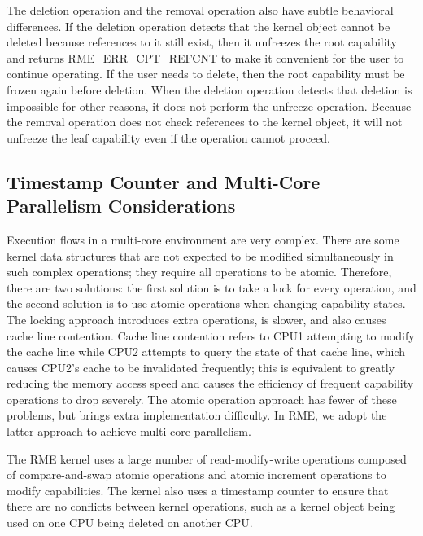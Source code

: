 The deletion operation and the removal operation also have subtle behavioral differences. If the deletion operation detects that the kernel object cannot be deleted because references to it still exist, then it unfreezes the root capability and returns RME\_ERR\_CPT\_REFCNT to make it convenient for the user to continue operating. If the user needs to delete, then the root capability must be frozen again before deletion. When the deletion operation detects that deletion is impossible for other reasons, it does not perform the unfreeze operation. Because the removal operation does not check references to the kernel object, it will not unfreeze the leaf capability even if the operation cannot proceed.

\subsection{Timestamp Counter and Multi-Core Parallelism Considerations}\label{subsec:2-timestamp-counter-and-multicore-parallelism}

Execution flows in a multi-core environment are very complex. There are some kernel data structures that are not expected to be modified simultaneously in such complex operations; they require all operations to be atomic. Therefore, there are two solutions: the first solution is to take a lock for every operation, and the second solution is to use atomic operations when changing capability states. The locking approach introduces extra operations, is slower, and also causes cache line contention. Cache line contention refers to CPU1 attempting to modify the cache line while CPU2 attempts to query the state of that cache line, which causes CPU2's cache to be invalidated frequently; this is equivalent to greatly reducing the memory access speed and causes the efficiency of frequent capability operations to drop severely. The atomic operation approach has fewer of these problems, but brings extra implementation difficulty. In RME, we adopt the latter approach to achieve multi-core parallelism.

The RME kernel uses a large number of read-modify-write operations composed of compare-and-swap atomic operations and atomic increment operations to modify capabilities. The kernel also uses a timestamp counter to ensure that there are no conflicts between kernel operations, such as a kernel object being used on one CPU being deleted on another CPU.

